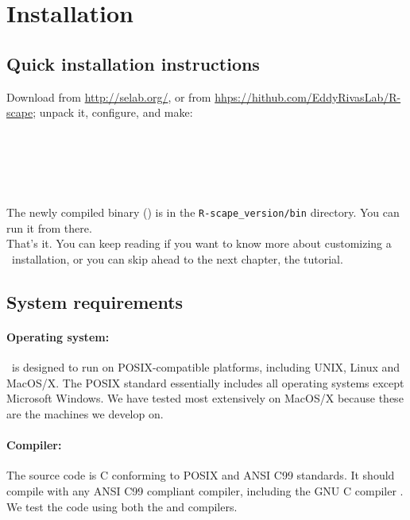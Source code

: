 \section{Installation}
\label{section:installation}
\setcounter{footnote}{0}

\subsection{Quick installation instructions}

Download  from \url{http://selab.org/}, or
from
\url{hhps://hithub.com/EddyRivasLab/R-scape};
unpack it, configure, and make:

\\
\\
\\ 
\\

The newly compiled binary () is in the
\texttt{R-scape\_version/bin} directory. You can run it from there.\\

That's it.  You can keep reading if you want to know more about
customizing a \rscape\ installation, or you can skip ahead to the next
chapter, the tutorial.


\subsection{System requirements}

\paragraph{Operating system:} \rscape\ is designed to run on
POSIX-compatible platforms, including UNIX, Linux and MacOS/X. The
POSIX standard essentially includes all operating systems except
Microsoft Windows. We have tested most extensively on MacOS/X because
these are the machines we develop on.

\paragraph{Compiler:} The source code is C conforming to POSIX and ANSI
C99 standards. It should compile with any ANSI C99 compliant compiler,
including the GNU C compiler . We test the code using both
the  and  compilers. 

